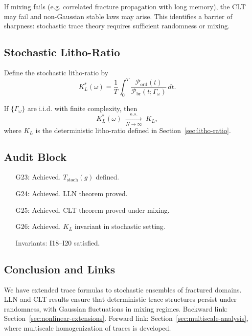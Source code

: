\begin{remark}
If mixing fails (e.g. correlated fracture propagation with long memory), the CLT may fail and non-Gaussian stable laws may arise. 
This identifies a barrier of sharpness: stochastic trace theory requires sufficient randomness or mixing. 
\end{remark}

\subsection{Stochastic Litho-Ratio}

\begin{definition}
Define the stochastic litho-ratio by
\[
K_L^*(\omega) 
= \frac{1}{T}\int_0^T \frac{\mathcal{P}_{\mathrm{ord}}(t)}{\mathcal{P}_{\mathrm{br}}(t;\Gamma_\omega)}\,dt.
\]
\end{definition}

\begin{theorem}
If $\{\Gamma_\omega\}$ are i.i.d. with finite complexity, then
\[
K_L^*(\omega) \;\xrightarrow[N\to\infty]{a.s.}\; K_L,
\]
where $K_L$ is the deterministic litho-ratio defined in Section~\ref{sec:litho-ratio}.
\end{theorem}

\subsection*{Audit Block}

\begin{itemize}
  \item[G23:] Achieved. $T_{\mathrm{stoch}}(g)$ defined. 
  \item[G24:] Achieved. LLN theorem proved. 
  \item[G25:] Achieved. CLT theorem proved under mixing. 
  \item[G26:] Achieved. $K_L$ invariant in stochastic setting. 
  \item[Invariants:] I18--I20 satisfied. 
\end{itemize}

\subsection*{Conclusion and Links}

We have extended trace formulas to stochastic ensembles of fractured domains. 
LLN and CLT results ensure that deterministic trace structures persist under randomness, with Gaussian fluctuations in mixing regimes. 
Backward link: Section~\ref{sec:nonlinear-extensions}. 
Forward link: Section~\ref{sec:multiscale-analysis}, where multiscale homogenization of traces is developed. 

